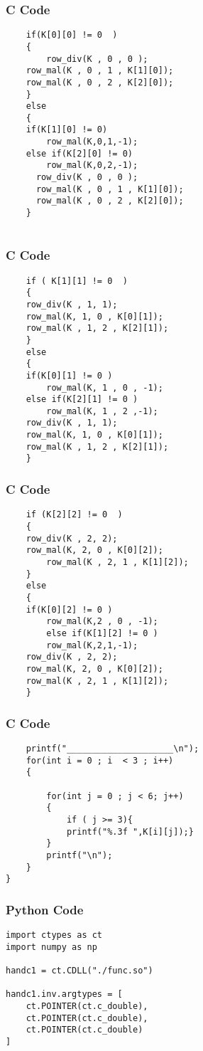 \documentclass{beamer}
\begin{document}
\begin{frame}[fragile]
    \frametitle{C Code  }
    \begin{lstlisting}
    if(K[0][0] != 0  )
    {
        row_div(K , 0 , 0 );
	row_mal(K , 0 , 1 , K[1][0]);
	row_mal(K , 0 , 2 , K[2][0]);		
    }
    else
    {
	if(K[1][0] != 0)
		row_mal(K,0,1,-1);
	else if(K[2][0] != 0)
		row_mal(K,0,2,-1);
	  row_div(K , 0 , 0 );
	  row_mal(K , 0 , 1 , K[1][0]);
	  row_mal(K , 0 , 2 , K[2][0]);		
    }


\end{lstlisting}
\end{frame}
\begin{frame}[fragile]
    \frametitle{C Code  }
    \begin{lstlisting}
    if ( K[1][1] != 0  )
    {
	row_div(K , 1, 1);
	row_mal(K, 1, 0 , K[0][1]);
	row_mal(K , 1, 2 , K[2][1]);
    }
    else
    {
	if(K[0][1] != 0 )
		row_mal(K, 1 , 0 , -1);
	else if(K[2][1] != 0 )
		row_mal(K, 1 , 2 ,-1);
	row_div(K , 1, 1);
	row_mal(K, 1, 0 , K[0][1]);
	row_mal(K , 1, 2 , K[2][1]);
    }
\end{lstlisting}
\end{frame}
\begin{frame}[fragile]
    \frametitle{C Code  }
    \begin{lstlisting}
    if (K[2][2] != 0  )
    {
	row_div(K , 2, 2);
	row_mal(K, 2, 0 , K[0][2]);
        row_mal(K , 2, 1 , K[1][2]);
    }
    else
    {
	if(K[0][2] != 0 )
		row_mal(K,2 , 0 , -1);
        else if(K[1][2] != 0 )
		row_mal(K,2,1,-1);
	row_div(K , 2, 2);
	row_mal(K, 2, 0 , K[0][2]);
	row_mal(K , 2, 1 , K[1][2]);
    }

\end{lstlisting}
\end{frame}
\begin{frame}[fragile]
    \frametitle{C Code  }
    \begin{lstlisting}
    printf("_____________________\n");
	for(int i = 0 ; i  < 3 ; i++)
	{   
	    
		for(int j = 0 ; j < 6; j++)
		{
		    if ( j >= 3){
			printf("%.3f ",K[i][j]);}
		}
		printf("\n");
	}	
}
\end{lstlisting}
\end{frame}

\begin{frame}[fragile]
    \frametitle{Python Code}
    \begin{lstlisting}
import ctypes as ct
import numpy as np

handc1 = ct.CDLL("./func.so")

handc1.inv.argtypes = [
    ct.POINTER(ct.c_double),
    ct.POINTER(ct.c_double),
    ct.POINTER(ct.c_double)
]

\end{lstlisting}
\end{frame}
\end{document}
